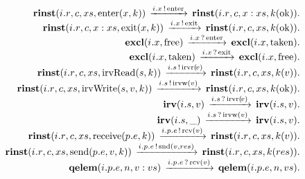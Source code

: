 \[
\begin{array}{r@{}c@{}llllll}
\\\Pfact{\Tstep{\Trinst{\Tr{\Tvar{R}}{\Tvar{I}}}{\Tvar{C}}{\Tvar{Xs}}{\TrteEnter{\Tvar{X}}{\Tvar{K}}}}{\Tsay{\Tx{\Tvar{X}}{\Tvar{I}}}{\Tenter}}{\Trinst{\Tr{\Tvar{R}}{\Tvar{I}}}{\Tvar{C}}{\Tcons{\Tvar{X}}{\Tvar{Xs}}}{\Tap{\Tvar{K}}{\Tok}}}}
\\\Pfact{\Tstep{\Trinst{\Tr{\Tvar{R}}{\Tvar{I}}}{\Tvar{C}}{\Tcons{\Tvar{X}}{\Tvar{Xs}}}{\TrteExit{\Tvar{X}}{\Tvar{K}}}}{\Tsay{\Tx{\Tvar{X}}{\Tvar{I}}}{\Texit}}{\Trinst{\Tr{\Tvar{R}}{\Tvar{I}}}{\Tvar{C}}{\Tvar{Xs}}{\Tap{\Tvar{K}}{\Tok}}}}
\\\Pfact{\Tstep{\Texcl{\Tx{\Tvar{X}}{\Tvar{I}}}{\Tfree}}{\Thear{\Tx{\Tvar{X}}{\Tvar{I}}}{\Tenter}}{\Texcl{\Tx{\Tvar{X}}{\Tvar{I}}}{\Ttaken}}}
\\\Pfact{\Tstep{\Texcl{\Tx{\Tvar{X}}{\Tvar{I}}}{\Ttaken}}{\Thear{\Tx{\Tvar{X}}{\Tvar{I}}}{\Texit}}{\Texcl{\Tx{\Tvar{X}}{\Tvar{I}}}{\Tfree}}}
\\\Pfact{\Tstep{\Trinst{\Tr{\Tvar{R}}{\Tvar{I}}}{\Tvar{C}}{\Tvar{Xs}}{\TrteIrvRead{\Tvar{S}}{\Tvar{K}}}}{\Tsay{\Ts{\Tvar{S}}{\Tvar{I}}}{\Tirvr{\Tvar{V}}}}{\Trinst{\Tr{\Tvar{R}}{\Tvar{I}}}{\Tvar{C}}{\Tvar{Xs}}{\Tap{\Tvar{K}}{\Tvar{V}}}}}
\\\Pfact{\Tstep{\Trinst{\Tr{\Tvar{R}}{\Tvar{I}}}{\Tvar{C}}{\Tvar{Xs}}{\TrteIrvWrite{\Tvar{S}}{\Tvar{V}}{\Tvar{K}}}}{\Tsay{\Ts{\Tvar{S}}{\Tvar{I}}}{\Tirvw{\Tvar{V}}}}{\Trinst{\Tr{\Tvar{R}}{\Tvar{I}}}{\Tvar{C}}{\Tvar{Xs}}{\Tap{\Tvar{K}}{\Tok}}}}
\\\Pfact{\Tstep{\Tirv{\Ts{\Tvar{S}}{\Tvar{I}}}{\Tvar{V}}}{\Thear{\Ts{\Tvar{S}}{\Tvar{I}}}{\Tirvr{\Tvar{V}}}}{\Tirv{\Ts{\Tvar{S}}{\Tvar{I}}}{\Tvar{V}}}}
\\\Pfact{\Tstep{\Tirv{\Ts{\Tvar{S}}{\Tvar{I}}}{\_}}{\Thear{\Ts{\Tvar{S}}{\Tvar{I}}}{\Tirvw{\Tvar{V}}}}{\Tirv{\Ts{\Tvar{S}}{\Tvar{I}}}{\Tvar{V}}}}
\\\Pfact{\Tstep{\Trinst{\Tr{\Tvar{R}}{\Tvar{I}}}{\Tvar{C}}{\Tvar{Xs}}{\TrteReceive{\Te{\Tvar{E}}{\Tvar{P}}}{\Tvar{K}}}}{\Tsay{\Tep{\Tvar{E}}{\Tvar{P}}{\Tvar{I}}}{\Trcv{\Tvar{V}}}}{\Trinst{\Tr{\Tvar{R}}{\Tvar{I}}}{\Tvar{C}}{\Tvar{Xs}}{\Tap{\Tvar{K}}{\Tvar{V}}}}}
\\\Pfact{\Tstep{\Trinst{\Tr{\Tvar{R}}{\Tvar{I}}}{\Tvar{C}}{\Tvar{Xs}}{\TrteSend{\Te{\Tvar{E}}{\Tvar{P}}}{\Tvar{V}}{\Tvar{K}}}}{\Tsay{\Tep{\Tvar{E}}{\Tvar{P}}{\Tvar{I}}}{\Tsnd{\Tvar{V}}{\Tvar{Res}}}}{\Trinst{\Tr{\Tvar{R}}{\Tvar{I}}}{\Tvar{C}}{\Tvar{Xs}}{\Tap{\Tvar{K}}{\Tvar{Res}}}}}
\\\Pfact{\Tstep{\Tqelem{\Tep{\Tvar{E}}{\Tvar{P}}{\Tvar{I}}}{\Tvar{N}}{\Tcons{\Tvar{V}}{\Tvar{Vs}}}}{\Thear{\Tep{\Tvar{E}}{\Tvar{P}}{\Tvar{I}}}{\Trcv{\Tvar{V}}}}{\Tqelem{\Tep{\Tvar{E}}{\Tvar{P}}{\Tvar{I}}}{\Tvar{N}}{\Tvar{Vs}}}}

\end{array}\]
